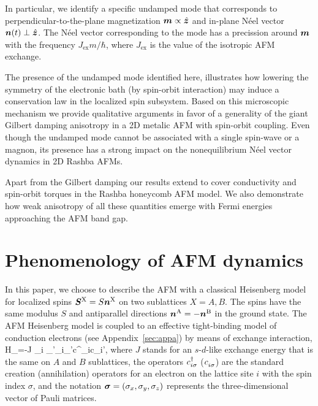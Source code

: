 In particular, we identify a specific undamped mode that corresponds to perpendicular-to-the-plane magnetization $\boldsymbol{m} \propto \hat{\boldsymbol{z}}$ and in-plane N\'eel vector $\boldsymbol{n}(t) \perp \hat{\boldsymbol{z}}$. The N\'eel vector corresponding to the mode has a precission around $\boldsymbol{m}$ with the frequency $J_\textrm{ex} m/\hbar$, where $J_\textrm{ex}$ is the value of the isotropic AFM exchange.

The presence of the undamped mode identified here, illustrates how lowering the symmetry of the electronic bath (by spin-orbit interaction) may induce a conservation law in the localized spin subsystem. Based on this microscopic mechanism we provide qualitative arguments in favor of a generality of the giant Gilbert damping anisotropy in a 2D metalic AFM with spin-orbit coupling. Even though the undamped mode cannot be associated with a single spin-wave or a magnon, its presence has a strong impact on the nonequilibrium N\'eel vector dynamics in 2D Rashba AFMs.

Apart from the Gilbert damping our results extend to cover conductivity and spin-orbit torques in the Rashba honeycomb AFM model. We also demonstrate how weak anisotropy of all these quantities emerge with Fermi energies approaching the AFM band gap. 

\section{Phenomenology of AFM dynamics}

In this paper, we choose to describe the AFM with a classical Heisenberg model for localized spins $\boldsymbol{S}^\textrm{X}= S \boldsymbol{n}^\textrm{X}$ on two sublattices $X=A,B$. The spins have the same modulus $S$ and antiparallel directions $\boldsymbol{n}^\textrm{A}=-\boldsymbol{n}^\textrm{B}$ in the ground state. The AFM Heisenberg model is coupled to an effective tight-binding model of conduction electrons (see Appendix~\ref{sec:appa}) by means of exchange interaction,
\be
\label{ex}
H_=-J \s_{i} \s_{\sigma\sigma'}_i\cdot \bb{\sigma}_{\sigma\sigma'}c^\dagger_{i\sigma}c\0_{i\sigma'},
\e
where $J$ stands for an $s$-$d$-like exchange energy that is the same on $A$ and $B$ sublattices, the operators $c^\dagger_{i\sigma}$ ($c\0_{i\sigma}$) are the standard creation (annihilation) operators for an electron on the lattice site $i$ with the spin index $\sigma$, and the notation $\boldsymbol{\sigma}=(\sigma_x,\sigma_y,\sigma_z)$ represents the three-dimensional vector of Pauli matrices. 

